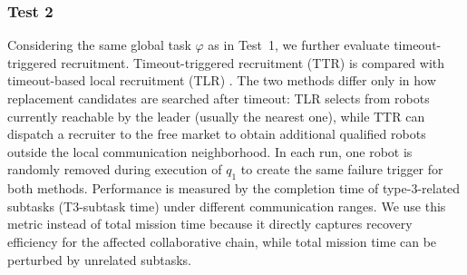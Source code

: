 \documentclass[lettersize,journal]{IEEEtran}
\begin{document}

\subsubsection{Test 2}

Considering the same global task $\varphi$ as in Test~1, we further evaluate timeout-triggered recruitment. Timeout-triggered recruitment (TTR) is compared with timeout-based local recruitment (TLR) \cite{kalempa2021multi}. The two methods differ only in how replacement candidates are searched after timeout: TLR selects from robots currently reachable by the leader (usually the nearest one), while TTR can dispatch a recruiter to the free market to obtain additional qualified robots outside the local communication neighborhood. In each run, one robot is randomly removed during execution of $q_1$ to create the same failure trigger for both methods.
Performance is measured by the completion time of type-3-related subtasks (T3-subtask time) under different communication ranges. We use this metric instead of total mission time because it directly captures recovery efficiency for the affected collaborative chain, while total mission time can be perturbed by unrelated subtasks.
\end{document}
